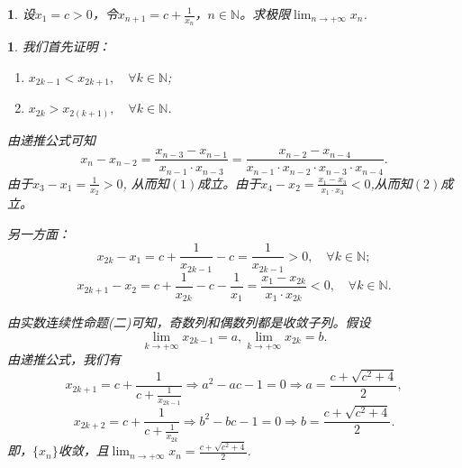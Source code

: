 \documentclass[utf8]{book}
\newtheorem{example}{}[section]             %
\newtheorem{solution}{}
\begin{document}
\begin{example}
设$x_1=c>0$，令$\displaystyle x_{n+1} = c + \frac{1}{x_n}$，$n\in\mathbb{N}$。求极限$\displaystyle \lim_{n\to +\infty}x_n$.
\end{example}
\begin{solution}
我们首先证明：
\renewcommand\labelenumi{\normalfont(\theenumi)}
\begin{enumerate}
\item $x_{2k-1} < x_{2k+1},\quad\forall k\in\mathbb{N}$;
\item $x_{2k} > x_{2(k+1)},\quad\forall k\in\mathbb{N}$.
\end{enumerate}
由递推公式可知
$$x_{n}-x_{n-2} = \frac{x_{n-3} - x_{n-1}}{x_{n-1}\cdot x_{n-3}} = \frac{x_{n-2} - x_{n-4}}{x_{n-1}\cdot x_{n-2}\cdot x_{n-3}\cdot x_{n-4}}.$$
由于$x_3-x_1 = \displaystyle\frac{1}{x_2} > 0$, 从而知$(1)$成立。由于$x_4-x_2 = \displaystyle\frac{x_1-x_3}{x_1\cdot x_3} < 0$,从而知$(2)$成立。

另一方面：
$$x_{2k}-x_1 = c+\frac{1}{x_{2k-1}}-c = \frac{1}{x_{2k-1}} > 0,\quad \forall k\in\mathbb{N};$$
$$x_{2k+1} - x_2 = c+\frac{1}{x_{2k}} - c -\frac{1}{x_1} = \frac{x_1 - x_{2k}}{x_1\cdot x_{2k}} < 0,\quad\forall k\in\mathbb{N}.$$

由实数连续性命题(二)可知，奇数列和偶数列都是收敛子列。假设
$$\displaystyle \lim_{k\to +\infty}x_{2k-1} = a, \lim_{k\to +\infty}x_{2k} = b.$$
由递推公式，我们有
$$x_{2k+1} =c+\frac{1}{c+\frac{1}{x_{2k-1}}}\Rightarrow a^2-ac-1 = 0\Rightarrow a = \frac{c+\sqrt{c^2 + 4}}{2},$$
$$x_{2k+2} =c+\frac{1}{c+\frac{1}{x_{2k}}}\Rightarrow b^2-bc-1 = 0\Rightarrow b = \frac{c+\sqrt{c^2 + 4}}{2}.$$
即，$\{x_n\}$收敛，且$\displaystyle \lim_{n\to +\infty}x_n=\frac{c+\sqrt{c^2+4}}{2}$.
\end{solution}
\end{document}
